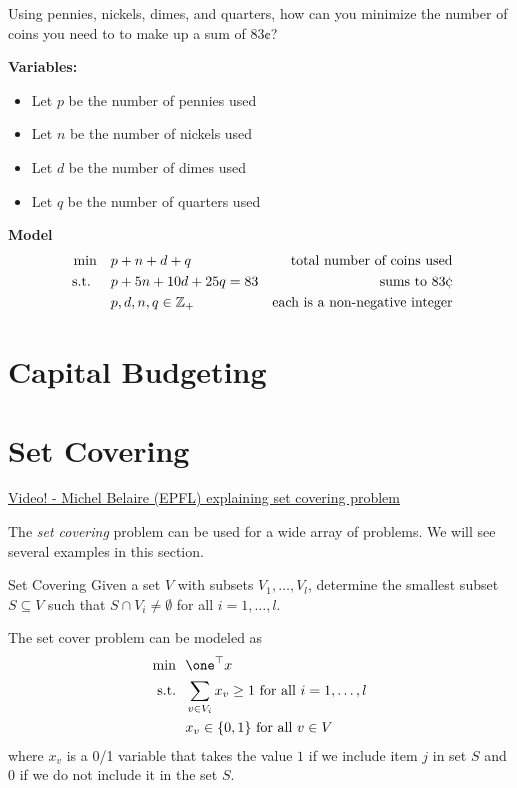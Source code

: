 \begin{example}
\label{ex:min-coins}
Using pennies, nickels, dimes, and quarters, how can you minimize the number of coins you need to to make up a sum of $83\cent$? 

\textbf{Variables:}
\begin{itemize}
\item Let $p$ be the number of pennies used
\item Let $n$ be the number of nickels used
\item Let $d$ be the number of dimes used
\item Let $q$ be the number of quarters used
\end{itemize}
\textbf{Model}
\begin{align*}
\min \quad & p + n + d + q & \text{ total number of coins used}\\
\text{ s.t. } \quad & p + 5n + 10d + 25 q = 83 & \text{sums to } 83 \cent\\
& p,d,n,q \in \Z_+ & \text{each is a non-negative integer}
\end{align*}
\end{example}
\section{Capital Budgeting}






\section{Set Covering}
\begin{resource}
\href{https://www.youtube.com/watch?v=cjSeHSjPmsk}{Video! - Michel Belaire (EPFL) explaining set covering problem}
\end{resource}

The \emph{set covering} problem can be used for a wide array of problems.    We will see several examples in this section.

\begin{general}{Set Covering}{\npcomplete}
\label{general:set-covering}
Given a set $V$ with subsets $V_1, \dots, V_l$, determine the smallest subset $S \subseteq V$ such that 
$S \cap V_i \neq \emptyset$ for all $i=1, \dots, l$.

The set cover problem can be modeled as
\begin{equation}
\begin{split}
\min \ \ & \one^\top x\\
\text{s.t.} \ \ & \sum_{v \in V_i} x_v \geq 1 \text{ for all } i =1, \dots, l \\ 
& x_v \in \{0,1\} \text{ for all } v \in V
\end{split}
\end{equation}
where $x_v$ is a 0/1 variable that takes the value $1$ if we include item $j$ in set $S$ and $0$ if we do not include it in the set $S$.  
\end{general}

